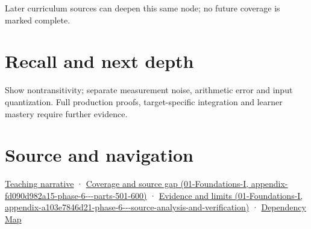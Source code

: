 Later curriculum sources can deepen this same node; no future coverage is marked complete.

\section{Recall and next depth}\label{appendix-b5b83329215b-recall-and-next-depth}

Show nontransitivity; separate measurement noise, arithmetic error and input quantization. Full production proofs, target-specific integration and learner mastery require further evidence.

\section{Source and navigation}\label{appendix-b5b83329215b-source-and-navigation}

\href{Continuous\%20Notes/Computing\%20Foundations\%20-\%20From\%20Bits\%20to\%20C++\%20and\%20Systems\%20APIs\#Reliability\%20begins\%20at\%20the\%20boundary\%20of\%20the\%20calculation}{Teaching narrative} · \href{../01-Foundations-I/main.pdf\#nameddest=appendix-fd090d982a15-phase-6---parts-501-600}{Coverage and source gap (01-Foundations-I, appendix-fd090d982a15-phase-6-\/-\/-parts-501-600)} · \href{../01-Foundations-I/main.pdf\#nameddest=appendix-a103e7846d21-phase-6---source-analysis-and-verification}{Evidence and limits (01-Foundations-I, appendix-a103e7846d21-phase-6-\/-\/-source-analysis-and-verification)} · \hyperref[appendix-4ad47bdd269a]{Dependency Map}
